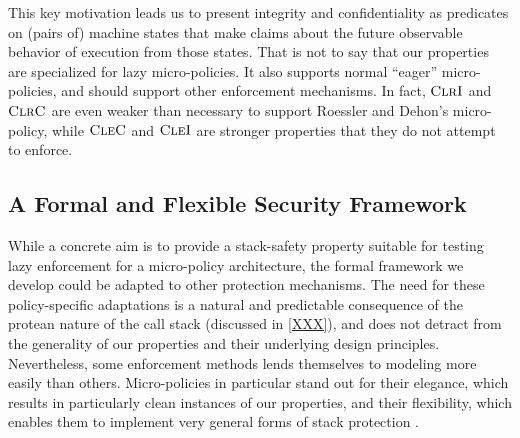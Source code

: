 This key motivation leads us to present integrity and confidentiality as predicates on (pairs of)
machine states that make claims about the future observable behavior of execution from those states.
That is not to say that our properties are specialized for lazy micro-policies. It also supports
normal ``eager'' micro-policies, and should support other enforcement mechanisms. In fact, \(\textnormal{\sc ClrI}\)
and \(\textnormal{\sc ClrC}\) are even weaker than necessary to support Roessler and Dehon's micro-policy,
while \(\textnormal{\sc CleC}\) and \(\textnormal{\sc CleI}\) are stronger properties that they do not attempt to enforce.
%
%



\subsection{A Formal and Flexible Security Framework}


While a concrete aim is to provide a stack-safety property suitable for testing
lazy enforcement for a micro-policy architecture, the formal framework we
develop could be adapted to other protection mechanisms.
%
The need for these policy-specific adaptations is a natural and predictable
consequence of the protean nature of the call stack (discussed in \cref{XXX}),
and does not detract from the generality of our properties and their
underlying  design principles.
%
Nevertheless, some enforcement methods lends themselves to modeling more easily
than others. Micro-policies in particular stand out for their elegance, which
results in particularly clean instances of our properties, and their
flexibility, which enables them to implement very general forms of stack
protection .

